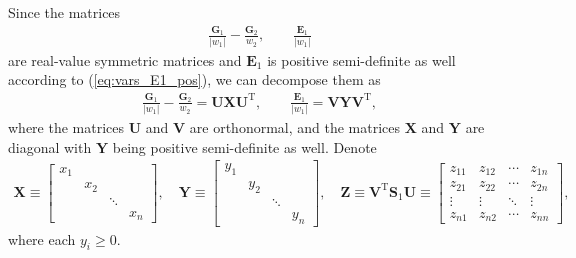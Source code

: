 \documentclass[12pt]{article}
\begin{document}
Since the matrices
\begin{align*}
\frac{\mathbf{G}_1}{| w_1 |} - \frac{\mathbf{G}_2}{w_2}, \qquad \frac{\mathbf{E}_1}{| w_1 |}
\end{align*}
are real-value symmetric matrices and $\mathbf{E}_1$ is positive semi-definite as well according to (\ref{eq:vars_E1_pos}), we can decompose them as \cite{Horn1990}
\begin{align}  \label{eq:G1+G2+E1_decompose}
\frac{\mathbf{G}_1}{| w_1 |} - \frac{\mathbf{G}_2}{w_2} = \mathbf{U} \mathbf{X} \mathbf{U}^{\mathrm{T}}, \qquad \frac{\mathbf{E}_1}{| w_1 |} = \mathbf{V} \mathbf{Y} \mathbf{V}^{\mathrm{T}},
\end{align}
where the matrices $\mathbf{U}$ and $\mathbf{V}$ are orthonormal, and the matrices $\mathbf{X}$ and $\mathbf{Y}$ are diagonal with $\mathbf{Y}$ being positive semi-definite as well. Denote
\begin{align*}
\mathbf{X} \equiv \begin{bmatrix} x_1 & & & \\ & x_2 & & \\ & & \ddots & \\ & & & x_n \end{bmatrix}, \quad
\mathbf{Y} \equiv \begin{bmatrix} y_1 & & & \\ & y_2 & & \\ & & \ddots & \\ & & & y_n \end{bmatrix}, \quad
\mathbf{Z} \equiv \mathbf{V}^{\mathrm{T}} \mathbf{S}_1 \mathbf{U} \equiv \begin{bmatrix} z_{11} & z_{12} & \cdots & z_{1n} \\ z_{21} & z_{22} & \cdots & z_{2n} \\ \vdots & \vdots & \ddots & \vdots \\ z_{n1} & z_{n2} & \cdots & z_{nn} \end{bmatrix},
\end{align*}
where each $y_i \geq 0$.
\end{document}
